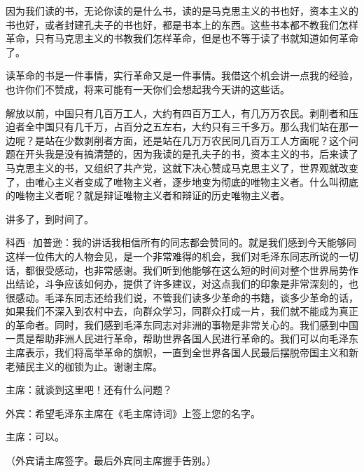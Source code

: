 因为我们读的书，无论你读的是什么书，读的是马克思主义的书也好，资本主义的书也好，或者封建孔夫子的书也好，都是书本上的东西。这些书本都不教我们怎样革命，只有马克思主义的书教我们怎样革命，但是也不等于读了书就知道如何革命了。

读革命的书是一件事情，实行革命又是一件事情。我借这个机会讲一点我的经验，也许你们不赞成，将来可能有一天你们会想起我今天讲的这些话。

解放以前，中国只有几百万工人，大约有四百万工人，有几万万农民。剥削者和压迫者全中国只有几千万，占百分之五左右，大约只有三千多万。那么我们站在那一边呢？是站在少数剥削者方面，还是站在几万万农民同几百万工人方面呢？这个问题在开头我是没有搞清楚的，因为我读的是孔夫子的书，资本主义的书，后来读了马克思主义的书，又组织了共产党，这就下决心赞成马克思主义了，世界观就改变了，由唯心主义者变成了唯物主义者，逐步地变为彻底的唯物主义者。什么叫彻底的唯物主义者呢？就是辩证唯物主义者和辩证的历史唯物主义者。

讲多了，到时间了。

科西·加普逊：我的讲话我相信所有的同志都会赞同的。就是我们感到今天能够同这样一位伟大的人物会见，是一个非常难得的机会，我们对毛泽东同志所说的一切话，都很受感动，也非常感谢。我们听到他能够在这么短的时间对整个世界局势作出结论，斗争应该如何办，提供了许多建议，对这点我们的印象是非常深刻的，也很感动。毛泽东同志还给我们说，不管我们读多少革命的书籍，谈多少革命的话，如果我们不深入到农村中去，向群众学习，同群众打成一片，我们就不能成为真正的革命者。同时，我们感到毛泽东同志对非洲的事物是非常关心的。我们感到中国一贯是帮助非洲人民进行革命，帮助世界各国人民进行革命的。我们可以向毛泽东主席表示，我们将高举革命的旗帜，一直到全世界各国人民最后摆脱帝国主义和新老殖民主义的枷锁为止。谢谢主席。

主席：就谈到这里吧！还有什么问题？

外宾：希望毛泽东主席在《毛主席诗词》上签上您的名字。

主席：可以。

（外宾请主席签字。最后外宾同主席握手告别。）


